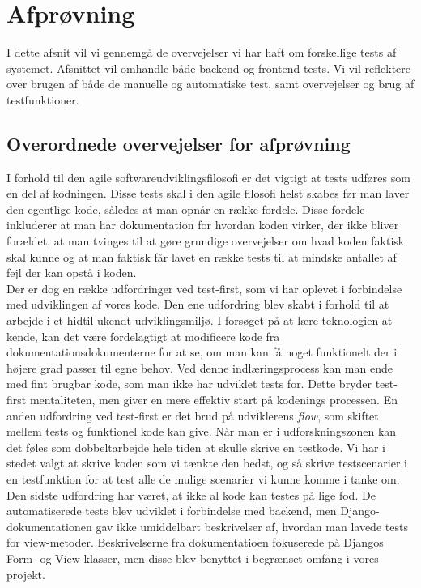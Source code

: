 \documentclass[]{article}
\begin{document}
\section{Afprøvning} \label{Afprovning}
I dette afsnit vil vi gennemgå de overvejelser vi har haft om forskellige tests af systemet. Afsnittet vil omhandle både backend og frontend tests. Vi vil reflektere over brugen af både de manuelle og automatiske test, samt overvejelser og brug af testfunktioner. 

\subsection{Overordnede overvejelser for afprøvning}

I forhold til den agile softwareudviklingsfilosofi er det vigtigt at tests udføres som en del af kodningen. Disse tests skal i den agile filosofi helst skabes før man laver den egentlige kode, således at man opnår en række fordele. Disse fordele inkluderer at man har dokumentation for hvordan koden virker, der ikke bliver forældet, at man tvinges til at gøre grundige overvejelser om hvad koden faktisk skal kunne og at man faktisk får lavet en række tests til at mindske antallet af fejl der kan opstå i koden.\\
\indent Der er dog en række udfordringer ved test-first, som vi har oplevet i forbindelse med  udviklingen af vores kode. Den ene udfordring blev skabt i forhold til at arbejde i et hidtil ukendt udviklingsmiljø. I forsøget på at lære teknologien at kende, kan det være fordelagtigt at modificere kode fra dokumentationsdokumenterne for at se, om man kan få noget funktionelt der i højere grad passer til egne behov. Ved denne indlæringsprocess kan man ende med fint brugbar kode, som man ikke har udviklet tests for. Dette bryder test-first mentaliteten, men giver en mere effektiv start på kodenings processen. En anden udfordring ved test-first er det brud på udviklerens \textit{flow}, som skiftet mellem tests og funktionel kode kan give. Når man er i udforskningszonen kan det føles som dobbeltarbejde hele tiden at skulle skrive en testkode. Vi har i stedet valgt at skrive koden som vi tænkte den bedst, og så skrive testscenarier i en testfunktion for at test alle de mulige scenarier vi kunne komme i tanke om. \\
\indent Den sidste udfordring har været, at ikke al kode kan testes på lige fod. De automatiserede tests blev udviklet i forbindelse med backend, men Django-dokumentationen gav ikke umiddelbart beskrivelser af, hvordan man lavede tests for view-metoder. Beskrivelserne fra dokumentatioen fokuserede på Djangos Form- og View-klasser, men disse blev benyttet i begrænset omfang i vores projekt.
\end{document}
